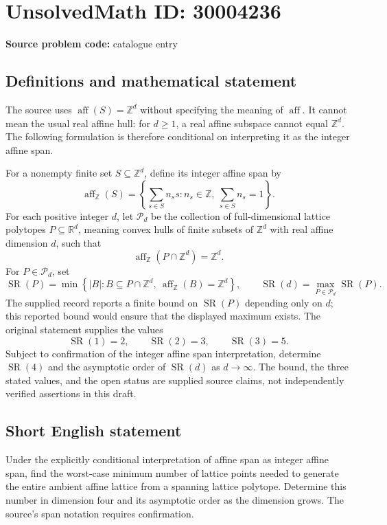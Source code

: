 \documentclass[11pt]{article}
\newcommand{\Z}{\mathbb{Z}}
\newcommand{\R}{\mathbb{R}}
\begin{document}
\section*{UnsolvedMath ID: 30004236}
\textbf{Source problem code:} catalogue entry
\subsection{Definitions and mathematical statement}
The source uses \(\operatorname{aff}(S)=\Z^d\) without specifying the meaning of \(\operatorname{aff}\). It cannot mean the usual real affine hull: for \(d\geq 1\), a real affine subspace cannot equal \(\Z^d\). The following formulation is therefore conditional on interpreting it as the integer affine span.

For a nonempty finite set \(S\subseteq\Z^d\), define its integer affine span by
\[
\operatorname{aff}_{\Z}(S)=\left\{\sum_{s\in S} n_s s : n_s\in\Z,\ \sum_{s\in S}n_s=1\right\}.
\]
For each positive integer \(d\), let \(\mathcal P_d\) be the collection of full-dimensional lattice polytopes \(P\subseteq\R^d\), meaning convex hulls of finite subsets of \(\Z^d\) with real affine dimension \(d\), such that
\[
\operatorname{aff}_{\Z}(P\cap\Z^d)=\Z^d.
\]
For \(P\in\mathcal P_d\), set
\[
\operatorname{SR}(P)=\min\left\{|B|:B\subseteq P\cap\Z^d,\ \operatorname{aff}_{\Z}(B)=\Z^d\right\},
\qquad
\operatorname{SR}(d)=\max_{P\in\mathcal P_d}\operatorname{SR}(P).
\]
The supplied record reports a finite bound on \(\operatorname{SR}(P)\) depending only on \(d\); this reported bound would ensure that the displayed maximum exists. The original statement supplies the values
\[
\operatorname{SR}(1)=2,\qquad \operatorname{SR}(2)=3,\qquad \operatorname{SR}(3)=5.
\]
Subject to confirmation of the integer affine span interpretation, determine \(\operatorname{SR}(4)\) and the asymptotic order of \(\operatorname{SR}(d)\) as \(d\to\infty\). The bound, the three stated values, and the open status are supplied source claims, not independently verified assertions in this draft.
\subsection{Short English statement}
Under the explicitly conditional interpretation of affine span as integer affine span, find the worst-case minimum number of lattice points needed to generate the entire ambient affine lattice from a spanning lattice polytope. Determine this number in dimension four and its asymptotic order as the dimension grows. The source's span notation requires confirmation.
\end{document}
